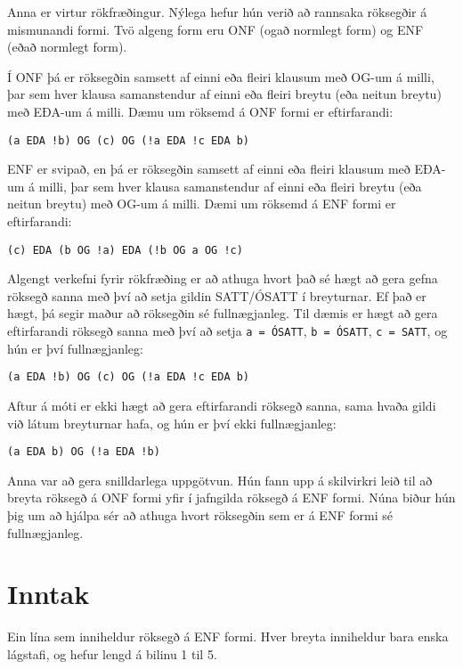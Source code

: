 
Anna er virtur rökfræðingur. Nýlega hefur hún verið að rannsaka röksegðir á
mismunandi formi. Tvö algeng form eru ONF (ogað normlegt form) og ENF (eðað
normlegt form).

Í ONF þá er röksegðin samsett af einni eða fleiri klausum með OG-um á milli,
þar sem hver klausa samanstendur af einni eða fleiri breytu (eða neitun breytu)
með EÐA-um á milli. Dæmu um röksemd á ONF formi er eftirfarandi:

\begin{center}
    \texttt{(a EDA !b) OG (c) OG (!a EDA !c EDA b)}
\end{center}

ENF er svipað, en þá er röksegðin samsett af einni eða fleiri klausum með EÐA-um á milli,
þar sem hver klausa samanstendur af einni eða fleiri breytu (eða neitun breytu)
með OG-um á milli. Dæmi um röksemd á ENF formi er eftirfarandi:

\begin{center}
    \texttt{(c) EDA (b OG !a) EDA (!b OG a OG !c)}
\end{center}

Algengt verkefni fyrir rökfræðing er að athuga hvort það sé hægt að gera gefna
röksegð sanna með því að setja gildin SATT/ÓSATT í breyturnar. Ef það er hægt,
þá segir maður að röksegðin sé fullnægjanleg. Til dæmis er hægt að gera
eftirfarandi röksegð sanna með því að setja \texttt{a = ÓSATT}, \texttt{b =
ÓSATT}, \texttt{c = SATT}, og hún er því fullnægjanleg:

\begin{center}
    \texttt{(a EDA !b) OG (c) OG (!a EDA !c EDA b)}
\end{center}

Aftur á móti er ekki hægt að gera eftirfarandi röksegð sanna, sama hvaða gildi
við látum breyturnar hafa, og hún er því ekki fullnægjanleg:

\begin{center}
    \texttt{(a EDA b) OG (!a EDA !b)}
\end{center}

Anna var að gera snilldarlega uppgötvun. Hún fann upp á skilvirkri leið til að
breyta röksegð á ONF formi yfir í jafngilda röksegð á ENF formi. Núna biður hún
þig um að hjálpa sér að athuga hvort röksegðin sem er á ENF formi sé
fullnægjanleg.

\section*{Inntak}
Ein lína sem inniheldur röksegð á ENF formi. Hver breyta inniheldur bara enska
lágstafi, og hefur lengd á bilinu 1 til 5.

